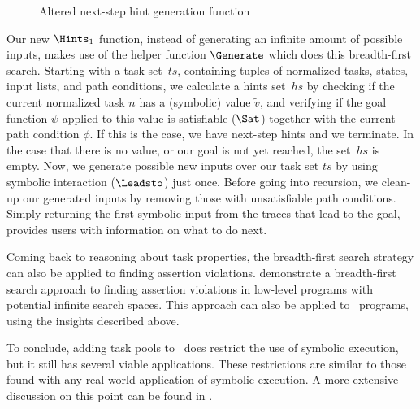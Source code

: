 \begin{figure*}
  \begin{mathpar}
  \end{mathpar}
  \caption{Altered next-step hint generation function}
  \label{fig:next-step-hints-new}
\end{figure*}

Our new $\Hints_1$ function, instead of generating an infinite amount of possible inputs,
makes use of the helper function $\Generate$ which does this breadth-first search.
Starting with a task set~$ts$, containing tuples of normalized tasks, states, input lists, and path conditions,
we calculate a hints set~$hs$ by checking if the current normalized task $n$ has a (symbolic) value $\tilde{v}$,
and verifying if the goal function $\psi$ applied to this value is satisfiable ($\Sat$) together with the current path condition $\phi$.
If this is the case, we have next-step hints and we terminate.
In the case that there is no value, or our goal is not yet reached,
the set~$hs$ is empty.
Now, we generate possible new inputs over our task set $ts$ by using symbolic interaction ($\Leadsto$) just once.
Before going into recursion, we clean-up our generated inputs by removing those with unsatisfiable path conditions.
Simply returning the first symbolic input from the traces that lead to the goal, provides users with information on what to do next.

Coming back to reasoning about task properties, the breadth-first search strategy can also be applied to finding assertion violations.
\citet{conf/tap/NausVSR23} demonstrate a breadth-first search approach to finding assertion violations in low-level programs with potential infinite search spaces.
This approach can also be applied to \DYNTOPHAT\ programs, using the insights described above.

To conclude, adding task pools to \TOPHAT\ does restrict the use of symbolic execution, but it still has several viable applications.
These restrictions are similar to those found with any real-world application of symbolic execution.
A more extensive discussion on this point can be found in \citet{conf/ifl/NausSK19}.